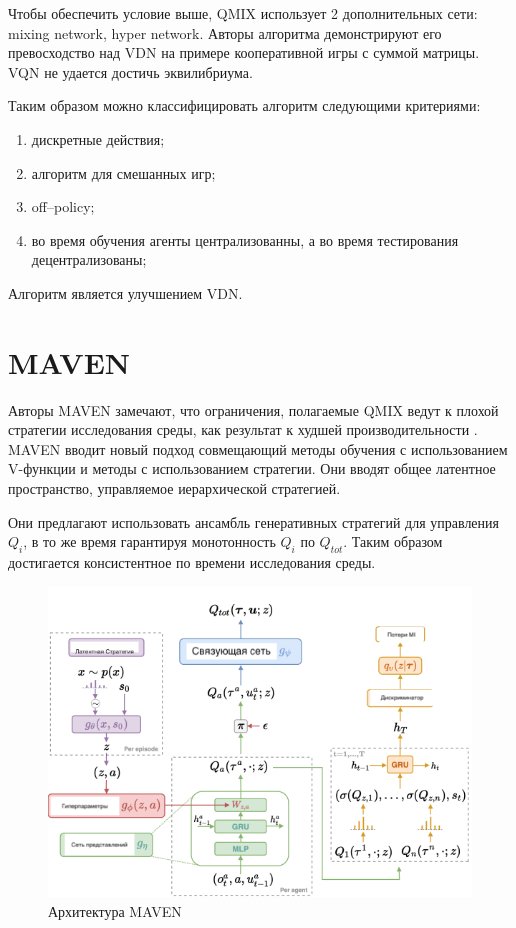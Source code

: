 Чтобы обеспечить условие выше, QMIX использует 2 дополнительных сети: mixing network, hyper network.
Авторы алгоритма демонстрируют его превосходство над VDN на примере кооперативной игры с суммой матрицы. VQN не удается достичь эквилибриума.

Таким образом можно классифицировать алгоритм следующими критериями:
\begin{enumerate}[label={\arabic*)}]
	\item дискретные действия;
	\item алгоритм для смешанных игр;
	\item off--policy;
	\item во время обучения агенты централизованны, а во время тестирования децентрализованы;
\end{enumerate}

Алгоритм является улучшением VDN.

\section{MAVEN}

Авторы MAVEN замечают, что ограничения, полагаемые QMIX ведут к плохой стратегии исследования среды, как результат к худшей производительности \cite{DBLP:journals/corr/abs-1910-07483}.
MAVEN вводит новый подход совмещающий методы обучения с использованием V-функции и методы с использованием стратегии. Они вводят общее латентное пространство, управляемое иерархической стратегией.

Они предлагают использовать ансамбль генеративных стратегий для управления \(Q_i\), в то же время гарантируя монотонность \(Q_i\) по \(Q_{tot}\).
Таким образом достигается консистентное по времени исследования среды.

\begin{figure}[H]
	\begin{center}
	\includegraphics[pages=-, width=140mm]{./inc/img/maven.png}
	\caption{Архитектура MAVEN}
	\label{fig:maven}
\end{center}
\end{figure}

